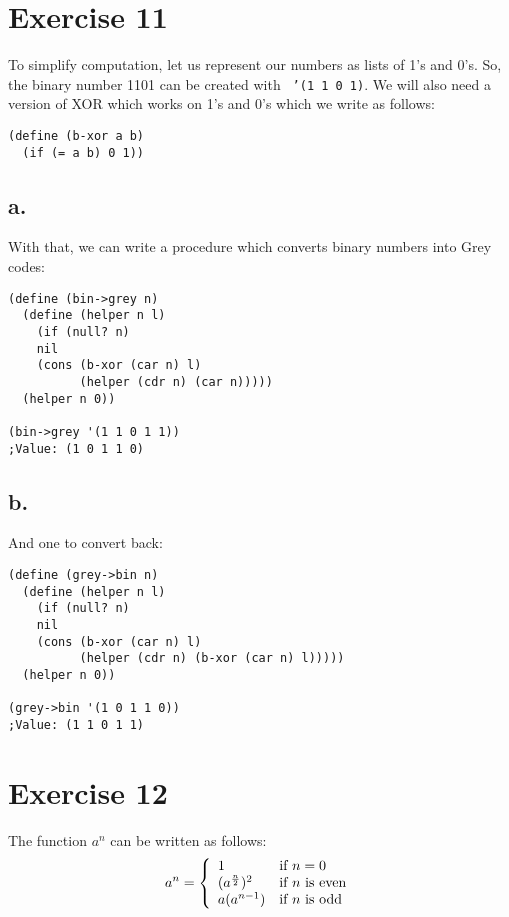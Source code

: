 \documentclass[12pt]{article}
\begin{document}
\section*{Exercise 11}

To simplify computation, let us represent our numbers as lists of
1's and 0's. So, the binary number 1101 can be created with {\tt
'(1 1 0 1)}. We will also need a version of XOR which works on 1's
and 0's which we write as follows:

\begin{verbatim}
(define (b-xor a b)
  (if (= a b) 0 1))
\end{verbatim}

\subsection*{a.} With that, we can write a procedure which converts binary numbers
into Grey codes:

\begin{verbatim}
(define (bin->grey n)
  (define (helper n l)
    (if (null? n)
    nil
    (cons (b-xor (car n) l)
          (helper (cdr n) (car n)))))
  (helper n 0))

(bin->grey '(1 1 0 1 1))
;Value: (1 0 1 1 0)
\end{verbatim}

\subsection*{b.} And one to convert back:

\begin{verbatim}
(define (grey->bin n)
  (define (helper n l)
    (if (null? n)
    nil
    (cons (b-xor (car n) l)
          (helper (cdr n) (b-xor (car n) l)))))
  (helper n 0))

(grey->bin '(1 0 1 1 0))
;Value: (1 1 0 1 1)
\end{verbatim}

\section*{Exercise 12}
The function $a^n$ can be written as follows:
\begin{displaymath}
a^n = \left\{ \begin{array}{ll}
    1 & $if $n = 0\\
    (a^\frac{n}{2})^2 & $if $n $ is even$\\
    a(a^{n - 1}) & $if $n $ is odd$\\
\end{array} \right.
\end{displaymath}
\end{document}
